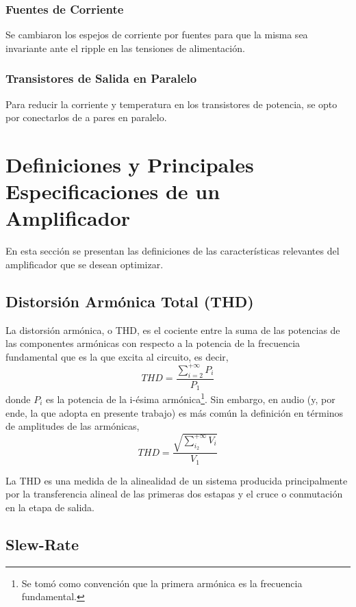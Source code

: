 \documentclass[a4paper,12pt,twoside]{article}
\begin{document}
\subsubsection{Fuentes de Corriente}
Se cambiaron los espejos de corriente por fuentes para que la misma sea invariante ante el ripple en las tensiones de alimentación. 

\subsubsection{Transistores de Salida en Paralelo}
Para reducir la corriente y temperatura en los transistores de potencia, se opto por conectarlos de a pares en paralelo.

\newpage
\section{Definiciones y Principales Especificaciones de un Amplificador}
\bigskip

En esta sección se presentan las definiciones de las características relevantes del amplificador que se desean optimizar.

\subsection{Distorsión Armónica Total (THD)}

La distorsión armónica, o THD,  es el cociente entre la suma de las potencias de las componentes armónicas con respecto a la potencia de la frecuencia fundamental que es la que excita al circuito, es decir,
\begin{equation} THD = \frac{\sum_{i=2}^{+\infty} P_i}{P_1} \end{equation}
donde $P_i$ es la potencia de la i-ésima armónica\footnote{Se tomó como convención que la primera armónica es la frecuencia fundamental.}. Sin embargo, en audio (y, por ende, la que adopta en presente trabajo) es más común la definición en términos de amplitudes de las armónicas,
\begin{equation} THD = \frac{\sqrt{\sum_{i_2}^{+\infty} V_i}}{V_1} \end{equation}

La THD es una medida de la alinealidad de un sistema producida principalmente por la transferencia alineal de las primeras dos estapas y el cruce o conmutación en la etapa de salida.

\subsection{Slew-Rate}
\end{document}
